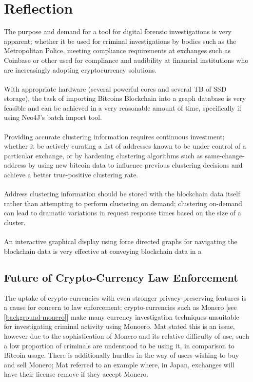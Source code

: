 \section{Reflection}
The purpose and demand for a tool for digital forensic investigations is very apparent; whether it be used for criminal investigations by bodies such as the Metropolitan Police, meeting compliance requirements at exchanges such as Coinbase or other used for compliance and audibility at financial institutions who are increasingly adopting cryptocurrency solutions. 
\\\\
With appropriate hardware (several powerful cores and several TB of SSD storage), the task of importing Bitcoins Blockchain into a graph database is very feasible and can be achieved in a very reasonable amount of time, specifically if using Neo4J's batch import tool. 
\\\\
Providing accurate clustering information requires continuous investment; whether it be actively curating a list of addresses known to be under control of a particular exchange, or by hardening clustering algorithms such as same-change-address by using new bitcoin data to influence previous clustering decisions and achieve a better true-positive clustering rate. 
\\\\
Address clustering information should be stored with the blockchain data itself rather than attempting to perform clustering on demand; clustering on-demand can lead to dramatic variations in request response times based on the size of a cluster. 
\\\\
An interactive graphical display using force directed graphs for navigating the blockchain data is very effective at conveying blockchain data in a 

\subsection{Future of Crypto-Currency Law Enforcement}
The uptake of crypto-currencies with even stronger privacy-preserving features is a cause for concern to law enforcement; crypto-currencies such as Monero [see \ref{background-monero}] make many currency investigation techniques unsuitable for investigating criminal activity using Monoero. Mat stated this is an issue, however due to the sophistication of Monero and its relative difficulty of use, such a low proportion of criminals are understood to be using it, in comparison to Bitcoin usage. There is additionally hurdles in the way of users wishing to buy and sell Monero; Mat referred to an example where, in Japan, exchanges will have their license remove if they accept Monero.

